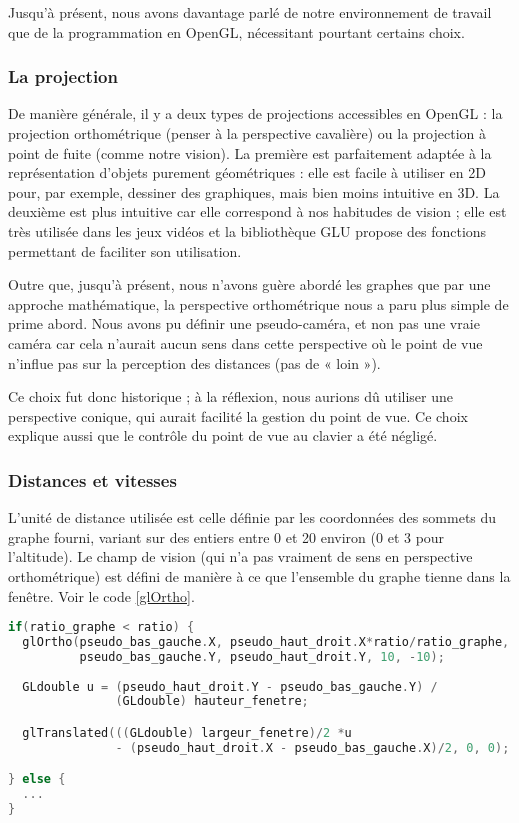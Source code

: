 \documentclass[a4paper, oneside, 11pt, twocolumn]{article}
\begin{document}
Jusqu'à présent, nous avons davantage parlé de notre environnement de travail que de la programmation en OpenGL, nécessitant pourtant certains choix.

\subsubsection{La projection}

De manière générale, il y a deux types de projections accessibles en OpenGL : la projection orthométrique (penser à la perspective cavalière) ou la projection à point de fuite (comme notre vision). La première est parfaitement adaptée à la représentation d'objets purement géométriques : elle est facile à utiliser en 2D pour, par exemple, dessiner des graphiques, mais bien moins intuitive en 3D. La deuxième est plus intuitive car elle correspond à nos habitudes de vision ; elle est très utilisée dans les jeux vidéos et la bibliothèque GLU propose des fonctions permettant de faciliter son utilisation.

Outre que, jusqu'à présent, nous n'avons guère abordé les graphes que par une approche mathématique, la perspective orthométrique nous a paru plus simple de prime abord. Nous avons pu définir une pseudo-caméra, et non pas une vraie caméra car cela n'aurait aucun sens dans cette perspective où le point de vue n'influe pas sur la perception des distances (pas de « loin »).

Ce choix fut donc historique ; à la réflexion, nous aurions dû utiliser une perspective conique, qui aurait facilité la gestion du point de vue. Ce choix explique aussi que le contrôle du point de vue au clavier a été négligé.

\subsubsection{Distances et vitesses}

L'unité de distance utilisée est celle définie par les coordonnées des sommets du graphe fourni, variant sur des entiers entre 0 et 20 environ (0 et 3 pour l'altitude). Le champ de vision (qui n'a pas vraiment de sens en perspective orthométrique) est défini de manière à ce que l'ensemble du graphe tienne dans la fenêtre. Voir le code \ref{glOrtho}.

  \begin{lstlisting}[language=C++, float=*thb, caption={Initialisation de la projection}, label=glOrtho, basicstyle=\small]
if(ratio_graphe < ratio) {
  glOrtho(pseudo_bas_gauche.X, pseudo_haut_droit.X*ratio/ratio_graphe, 
          pseudo_bas_gauche.Y, pseudo_haut_droit.Y, 10, -10);
  
  GLdouble u = (pseudo_haut_droit.Y - pseudo_bas_gauche.Y) /
               (GLdouble) hauteur_fenetre;

  glTranslated(((GLdouble) largeur_fenetre)/2 *u
               - (pseudo_haut_droit.X - pseudo_bas_gauche.X)/2, 0, 0);

} else {
  ...
}
\end{lstlisting}
\end{document}
